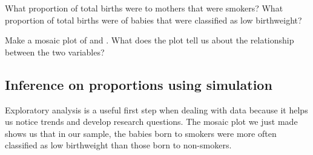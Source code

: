\documentclass[11pt]{article}
\begin{document}
\begin{exercise}
\label{table}
What proportion of total births were to mothers that were smokers?  What proportion of total births were of babies that were classified as low birthweight?
\end{exercise}

\begin{exercise}
Make a mosaic plot of  and . What does the plot tell us about the relationship between the two variables?
\end{exercise}

%
%
%
%
%
%
%
%

\subsection*{Inference on proportions using simulation}
Exploratory analysis is a useful first step when dealing with data because it helps us notice trends and develop research questions.  The mosaic plot we just made shows us that in our sample, the babies born to smokers were more often classified as low birthweight than those born to non-smokers. 
\end{document}
